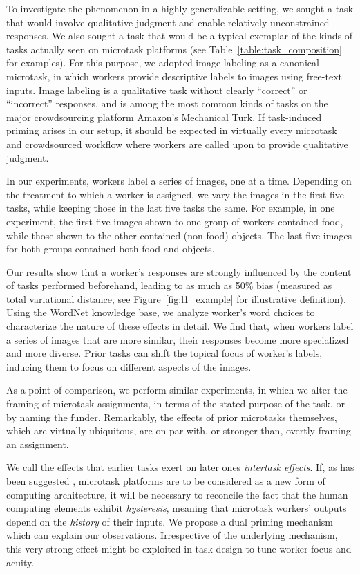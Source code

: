 \documentclass{sigchi}
\begin{document}
To investigate the phenomenon in a
highly generalizable setting, we sought a task that would involve 
qualitative judgment and enable relatively unconstrained responses. 
We also sought a task that would be a typical exemplar of the kinds of
tasks actually seen on microtask platforms (see 
Table~\ref{table:task_composition} for examples).  For this purpose, we 
adopted
image-labeling as a canonical microtask, in which workers provide 
descriptive labels to images using free-text inputs.  Image labeling is
a qualitative task without clearly ``correct'' or ``incorrect'' responses,
and is among the most common kinds of tasks on the major crowdsourcing
platform Amazon's Mechanical Turk.  If task-induced priming arises in our 
setup, it should be expected in virtually every microtask and 
crowdsourced workflow where workers are called upon to provide qualitative
judgment.

In our experiments, workers label a series of images, one at a time.
Depending on the treatment to which a worker is assigned, we vary the
images in the first five tasks, while keeping those in the last five tasks 
the same.  For example, in one experiment, the first five images shown to
one group of workers contained food, while those shown to the other 
contained (non-food) objects.  The last five images for both
groups contained both food and objects.

Our results show that a worker's responses are strongly influenced by 
the content of tasks performed beforehand, leading to as much as 50\%
bias (measured as total variational distance, 
see Figure~\ref{fig:l1_example} for illustrative definition).  
Using the WordNet 
knowledge base, we analyze worker's word choices to characterize 
the nature of these effects in detail.  We find that, when workers 
label a series of images that are more similar, their responses become 
more specialized and more diverse.  
Prior tasks can shift the topical focus of 
worker's labels, inducing them to focus on different aspects of the images.

As a point of comparison, we perform similar experiments, in which we
alter the framing of microtask assignments, in terms of the stated purpose
of the task, or by naming the funder.
Remarkably, the effects of prior microtasks themselves,
which are virtually ubiquitous, are on par with, or stronger than, 
overtly framing an assignment.

We call the effects that earlier tasks exert on later ones 
\textit{intertask effects}.  If, as has been suggested \cite{5543192}, 
microtask platforms are to be considered as a new form of computing 
architecture, it will be necessary to reconcile the fact that the human 
computing elements exhibit \textit{hysteresis}, 
meaning that microtask workers' outputs 
depend on the \textit{history} of their inputs.
We propose a dual priming mechanism which can explain our
observations.  Irrespective of the underlying mechanism, this 
very strong effect might be exploited in task design to tune worker 
focus and acuity.
\end{document}
